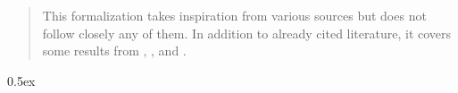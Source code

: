 \documentclass[11pt,a4paper]{report}
\begin{document}
\begin{abstract}
This formalization takes inspiration from various sources but does not follow closely any of them.
In addition to already cited literature, it covers some results from  \cite{BaratellaFerro1993}, \cite{Behounek1998}, \cite{ManciniZambella2001} and \cite{KayeWong2007}.
	
	
%
%
%
%
%
%
\end{abstract}

\tableofcontents
\vspace{\baselineskip}

\parindent 0pt\parskip 0.5ex



\cleardoublepage
{}
{}
\renewcommand{\bibname}{References}


\end{document}
